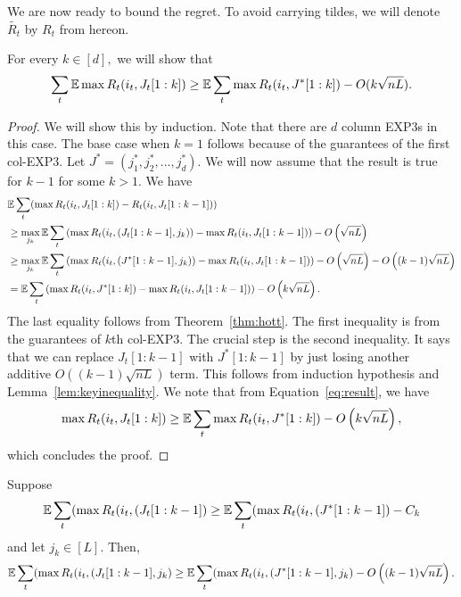 We are now ready to bound the regret. %
To avoid carrying tildes, we will denote $\tilde{R_t}$  by $R_t$ from hereon. 
\begin{lemma}
For every $ k \in [d],$ we will show that 
$$ \sum_t \mathbb{E} \max R_t(i_t,J_t[1:k]) \geq  \mathbb{E} \sum_t \max R_t(i_t,J^*[1:k]) - O(k\sqrt{nL}).$$ 
\end{lemma}
\begin{proof}
We will show this by induction. Note that there are $d$ column EXP3s in this case. The base case when $k=1$ follows because of the guarantees of the first col-EXP3.
Let $J^* = (j_1^*,j_2^*,...,j_d^*).$   We will now assume that the result is true for $k-1$ for some $k>1.$
We have 
\begin{align}
& \mathbb{E}  \sum_t (\max R_t(i_t,J_t[1:k]) - R_t(i_t,J_t[1:k-1])) \\
&\geq \max_{j_k} \mathbb{E} \sum_t \left( \max R_t(i_t,(J_t[1:k-1],j_k)) - \max R_t(i_t,J_t[1:k-1]) \right) - O\left(\sqrt{nL}\right) \\
&\geq \max_{j_k} \mathbb{E} \sum_t  \left( \max R_t(i_t,(J^*[1:k-1],j_k))  - \max R_t(i_t,J_t[1:k-1]) \right) - O\left( \sqrt{nL} \right) - O\left( (k-1)\sqrt{nL} \right)   \\
\label{eq:result}
& =  \mathbb{E} \sum_t \left( \max R_t(i_t,J^*[1:k]) - \max R_t(i_t,J_t[1:k-1]) \right) - O\left( k\sqrt{nL} \right).
\end{align}
The last equality follows from Theorem~\ref{thm:hott}. The first inequality is from the guarantees of $k$th col-EXP3. The crucial step is  the second inequality. It says that we can replace $J_t[1:k-1]$ with $J^*[1:k-1]$ by just losing another additive $O\left( (k-1) \sqrt{nL} \right)$ term. This follows from induction hypothesis and Lemma~\ref{lem:keyinequality}. We note that from Equation~\ref{eq:result}, we have
$$ \max R_t(i_t,J_t[1:k]) \geq  \mathbb{E} \sum_t \max R_t(i_t,J^*[1:k]) - O\left( k \sqrt{nL} \right),$$
which concludes the proof.
\end{proof}
\begin{lemma}
\label{lem:keyinequality}
Suppose
 $$ \mathbb{E} \sum_t (\max R_t(i_t,(J_t[1:k-1]) \geq  \mathbb{E} \sum_t (\max R_t(i_t,(J^*[1:k-1])  - C_k$$
  and let $j_k \in [L].$ Then,
$$ \mathbb{E} \sum_t (\max R_t(i_t,(J_t[1:k-1],j_k) \geq \mathbb{E} \sum_t (\max R_t(i_t,(J^*[1:k-1],j_k) - O\left((k-1) \sqrt{nL} \right).$$
\end{lemma}

